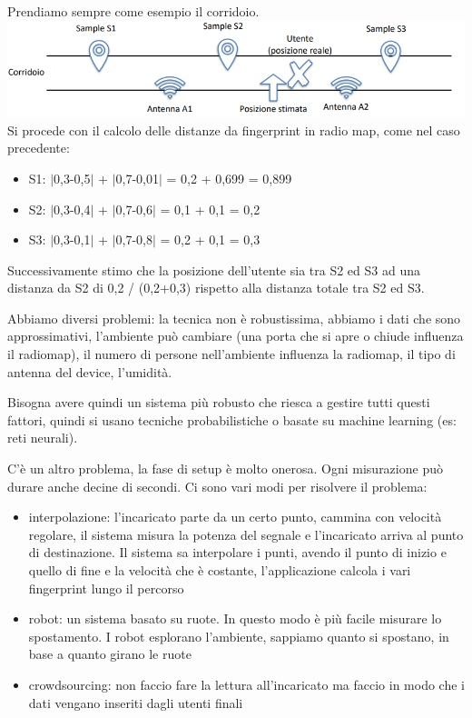 Prendiamo sempre come esempio il corridoio. \\
\includegraphics[width=\textwidth]{images/MobiDEV/1. posizionamento indoor/fingerprinting 3.PNG}
Si procede con il calcolo delle distanze da fingerprint in radio map, come nel caso precedente:
\begin{itemize}
    \item S1: $|$0,3-0,5$|$ + $|$0,7-0,01$|$ = 0,2 + 0,699 = 0,899
    \item S2: $|$0,3-0,4$|$ + $|$0,7-0,6$|$ = 0,1 + 0,1 = 0,2
    \item S3: $|$0,3-0,1$|$ + $|$0,7-0,8$|$ = 0,2 + 0,1 = 0,3
\end{itemize}
Successivamente stimo che la posizione dell'utente sia tra S2 ed S3 ad una distanza da S2 di 0,2 / (0,2+0,3) rispetto alla distanza totale tra S2 ed S3.

Abbiamo diversi problemi: la tecnica non è robustissima, abbiamo i dati che sono approssimativi, l'ambiente può cambiare (una porta che si apre o chiude influenza il radiomap), il numero di persone nell'ambiente influenza la radiomap, il tipo di antenna del device, l'umidità.

Bisogna avere quindi un sistema più robusto che riesca a gestire tutti questi fattori, quindi si usano tecniche probabilistiche o basate su machine learning (es: reti neurali).

C'è un altro problema, la fase di setup è molto onerosa. 
Ogni misurazione può durare anche decine di secondi. 
Ci sono vari modi per risolvere il problema:
\begin{itemize}
    \item interpolazione: l'incaricato parte da un certo punto, cammina con velocità regolare, il sistema misura la potenza del segnale e l'incaricato arriva al punto di destinazione. Il sistema sa interpolare i punti, avendo il punto di inizio e quello di fine e la velocità che è costante, l'applicazione calcola i vari fingerprint lungo il percorso
    \item robot: un sistema basato su ruote. In questo modo è più facile misurare lo spostamento. I robot esplorano l'ambiente, sappiamo quanto si spostano, in base a quanto girano le ruote
    \item crowdsourcing: non faccio fare la lettura all'incaricato ma faccio in modo che i dati vengano inseriti dagli utenti finali
\end{itemize}

